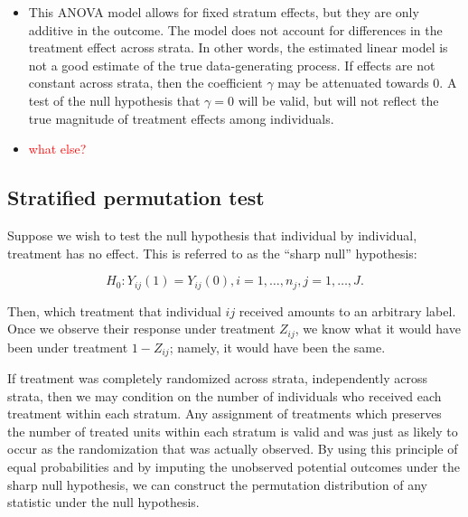 \documentclass[11pt]{article}
\newcommand{\bit}{\begin{itemize}}
\newcommand{\eit}{\end{itemize}}
\newcommand{\todo}[1]{{\color{red}{TO DO: \sc #1}}}
\begin{document}
\todo{Add a paragraph about why this might go wrong, perhaps some citations. All depends on estimating the error variance correctly, because $t$ distribution is the ratio of a normal and a chi-square}
\bit
\item This ANOVA model allows for fixed stratum effects, but they are only additive in the outcome.  The model does not account for differences in the treatment effect across strata.  In other words, the estimated linear model is not a good estimate of the true data-generating process.  If effects are not constant across strata, then the coefficient $\gamma$ may be attenuated towards 0.  A test of the null hypothesis that $\gamma = 0$ will be valid, but will not reflect the true magnitude of treatment effects among individuals.
\item \textcolor{red}{ what else? }
\eit

\subsection{Stratified permutation test}
Suppose we wish to test the null hypothesis that individual by individual, treatment has no effect.
This is referred to as the ``sharp null'' hypothesis:

$$H_0: Y_{ij}(1) = Y_{ij}(0), i = 1, \dots, n_j, j = 1,\dots, J.$$

Then, which treatment that individual $ij$ received amounts to an arbitrary label.
Once we observe their response under treatment $Z_{ij}$, we know what it would have been under treatment $1-Z_{ij}$; namely, it would have been the same.

If treatment was completely randomized across strata, independently across strata,
then we may condition on the number of individuals who received each treatment within each stratum.
Any assignment of treatments which preserves the number of treated units within each stratum is valid and was just as likely to occur as the randomization that was actually observed.
By using this principle of equal probabilities and by imputing the unobserved potential outcomes under the sharp null hypothesis, we can construct the permutation distribution of any statistic under the null hypothesis.
\end{document}
